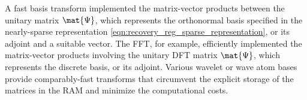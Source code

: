 A fast basis transform implemented
the matrix-vector products between
the unitary matrix $\mat{\Psi}$, which represents
the orthonormal basis specified in
the nearly-sparse representation
\eqref{eqn:recovery_reg_sparse_representation}, or
its adjoint and
a suitable vector.
The \ac{FFT}, for example,
efficiently implemented
the matrix-vector products involving
the unitary \ac{DFT} matrix $\mat{\Psi}$, which represents
the discrete  basis, or
its adjoint.
Various wavelet
\cite{book:Mallat2009} or
wave atom bases
\cite{article:DemanetACHA2007} provide
comparably-fast transforms that circumvent
the explicit storage of
the matrices in
the \ac{RAM} and minimize
the computational costs.
